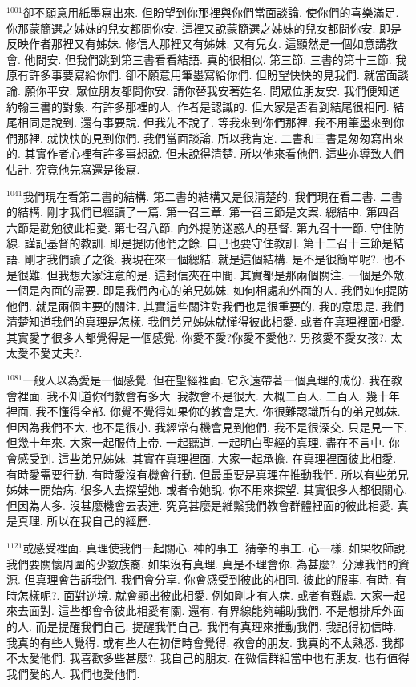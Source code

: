 \documentclass{book}
\begin{document}
$^{1001}$卻不願意用紙墨寫出來.
但盼望到你那裡與你們當面談論.
使你們的喜樂滿足.
你那蒙簡選之姊妹的兒女都問你安.
這裡又說蒙簡選之姊妹的兒女都問你安.
即是反映作者那裡又有姊妹.
修信人那裡又有姊妹.
又有兒女.
這顯然是一個如意講教會.
他問安.
但我們跳到第三書看看結語.
真的很相似.
第三節.
三書的第十三節.
我原有許多事要寫給你們.
卻不願意用筆墨寫給你們.
但盼望快快的見我們.
就當面談論.
願你平安.
眾位朋友都問你安.
請你替我安著姓名.
問眾位朋友安.
我們便知道約翰三書的對象.
有許多那裡的人.
作者是認識的.
但大家是否看到結尾很相同.
結尾相同是說到.
還有事要說.
但我先不說了.
等我來到你們那裡.
我不用筆墨來到你們那裡.
就快快的見到你們.
我們當面談論.
所以我肯定.
二書和三書是匆匆寫出來的.
其實作者心裡有許多事想說.
但未說得清楚.
所以他來看他們.
這些亦導致人們估計.
究竟他先寫還是後寫.

$^{1041}$我們現在看第二書的結構.
第二書的結構又是很清楚的.
我們現在看二書.
二書的結構.
剛才我們已經讀了一篇.
第一召三章.
第一召三節是文案.
總結中.
第四召六節是勸勉彼此相愛.
第七召八節.
向外提防迷惑人的基督.
第九召十一節.
守住防線.
謹記基督的教訓.
即是提防他們之餘.
自己也要守住教訓.
第十二召十三節是結語.
剛才我們讀了之後.
我現在來一個總結.
就是這個結構.
是不是很簡單呢?.
也不是很難.
但我想大家注意的是.
這封信夾在中間.
其實都是那兩個關注.
一個是外敵.
一個是內面的需要.
即是我們內心的弟兄姊妹.
如何相處和外面的人.
我們如何提防他們.
就是兩個主要的關注.
其實這些關注對我們也是很重要的.
我的意思是.
我們清楚知道我們的真理是怎樣.
我們弟兄姊妹就懂得彼此相愛.
或者在真理裡面相愛.
其實愛字很多人都覺得是一個感覺.
你愛不愛?你愛不愛他?.
男孩愛不愛女孩?.
太太愛不愛丈夫?.

$^{1081}$一般人以為愛是一個感覺.
但在聖經裡面.
它永遠帶著一個真理的成份.
我在教會裡面.
我不知道你們教會有多大.
我教會不是很大.
大概二百人.
二百人.
幾十年裡面.
我不懂得全部.
你覺不覺得如果你的教會是大.
你很難認識所有的弟兄姊妹.
但因為我們不大.
也不是很小.
我經常有機會見到他們.
我不是很深交.
只是見一下.
但幾十年來.
大家一起服侍上帝.
一起聽道.
一起明白聖經的真理.
盡在不言中.
你會感受到.
這些弟兄姊妹.
其實在真理裡面.
大家一起承擔.
在真理裡面彼此相愛.
有時愛需要行動.
有時愛沒有機會行動.
但最重要是真理在推動我們.
所以有些弟兄姊妹一開始病.
很多人去探望她.
或者令她說.
你不用來探望.
其實很多人都很關心.
但因為人多.
沒甚麼機會去表達.
究竟甚麼是維繫我們教會群體裡面的彼此相愛.
真是真理.
所以在我自己的經歷.

$^{1121}$或感受裡面.
真理使我們一起關心.
神的事工.
猜拳的事工.
心一樣.
如果牧師說.
我們要關懷周圍的少數族裔.
如果沒有真理.
真是不理會你.
為甚麼?.
分薄我們的資源.
但真理會告訴我們.
我們會分享.
你會感受到彼此的相同.
彼此的服事.
有時.
有時怎樣呢?.
面對逆境.
就會顯出彼此相愛.
例如剛才有人病.
或者有難處.
大家一起來去面對.
這些都會令彼此相愛有關.
還有.
有界線能夠輔助我們.
不是想排斥外面的人.
而是提醒我們自己.
提醒我們自己.
我們有真理來推動我們.
我記得初信時.
我真的有些人覺得.
或有些人在初信時會覺得.
教會的朋友.
我真的不太熟悉.
我都不太愛他們.
我喜歡多些甚麼?.
我自己的朋友.
在微信群組當中也有朋友.
也有值得我們愛的人.
我們也愛他們.
\end{document}
